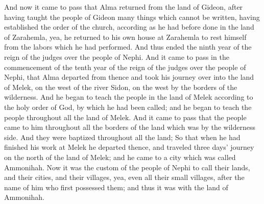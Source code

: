 And now it came to pass that Alma returned from the land of Gideon, after having taught the people of Gideon many things which cannot be written, having established the order of the church, according as he had before done in the land of Zarahemla, yea, he returned to his own house at Zarahemla to rest himself from the labors which he had performed.
\bverse \iffalse And thus ended the ninth year of the reign of the judges over the people of Nephi. \fi
And thus ended the ninth year of the reign of the judges over the people of Nephi.
\bverse \iffalse And it came to pass in the commencement of the tenth year of the reign of the judges over the people of Nephi, that Alma departed from thence and took his journey over into the land of Melek, on the west of the river Sidon, on the west by the borders of the wilderness. \fi
And it came to pass in the commencement of the tenth year of the reign of the judges over the people of Nephi, that Alma departed from thence and took his journey over into the land of Melek, on the west of the river Sidon, on the west by the borders of the wilderness.
\bverse \iffalse And he began to teach the people in the land of Melek according to the holy order of God, by which he had been called; and he began to teach the people throughout all the land of Melek. \fi
And he began to teach the people in the land of Melek according to the holy order of God, by which he had been called; and he began to teach the people throughout all the land of Melek.
\bverse \iffalse And it came to pass that the people came to him throughout all the borders of the land which was by the wilderness side. And they were baptized throughout all the land; \fi
And it came to pass that the people came to him throughout all the borders of the land which was by the wilderness side. And they were baptized throughout all the land;
\bverse \iffalse So that when he had finished his work at Melek he departed thence, and traveled three days' journey on the north of the land of Melek; and he came to a city which was called Ammonihah. \fi
So that when he had finished his work at Melek he departed thence, and traveled three days' journey on the north of the land of Melek; and he came to a city which was called Ammonihah.
\bverse \iffalse Now it was the custom of the people of Nephi to call their lands, and their cities, and their villages, yea, even all their small villages, after the name of him who first possessed them; and thus it was with the land of Ammonihah. \fi
Now it was the custom of the people of Nephi to call their lands, and their cities, and their villages, yea, even all their small villages, after the name of him who first possessed them; and thus it was with the land of Ammonihah.
